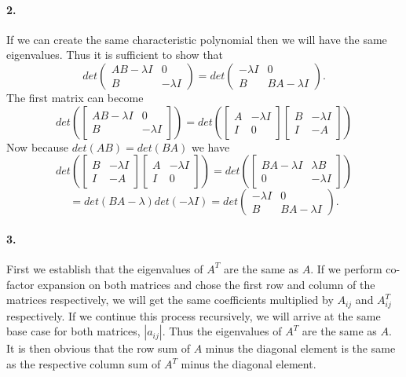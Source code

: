 \documentclass[12pt]{article}
\begin{document}
\paragraph{2.}
	If we can create the same characteristic polynomial then we will have the same eigenvalues. Thus it is sufficient to show that
	\[
	det
	\left(\begin{matrix}
	AB-\lambda I & 0 \\
	B & -\lambda I
	\end{matrix}\right)
	= det
	\left(\begin{matrix}
	-\lambda I & 0 \\
	B & BA-\lambda I
	\end{matrix}\right).
	\]
	The first matrix can become
	\[
	det
	\left(\left[\begin{matrix}
	AB-\lambda I & 0 \\
	B & -\lambda I
	\end{matrix}\right]\right)
	=
	det
	\left(\left[\begin{matrix}
	A & -\lambda I \\
	I & 0
	\end{matrix}\right]
	\left[\begin{matrix}
	B & -\lambda I \\
	I & -A
	\end{matrix}\right]\right)
	\]
	Now because $det(AB) = det(BA)$ we have 
	\[
	det
	\left(\left[\begin{matrix}
	B & -\lambda I \\
	I & -A
	\end{matrix}\right]
	\left[\begin{matrix}
	A & -\lambda I \\
	I & 0
	\end{matrix}\right]\right)
	= det
	\left(\left[\begin{matrix}
	BA-\lambda I & \lambda B \\
	0 & -\lambda I
	\end{matrix}\right]\right)
	\]	
	\[
	= det(BA-\lambda)det(-\lambda I) =
	det
	\left(\begin{matrix}
	-\lambda I & 0 \\
	B & BA-\lambda I
	\end{matrix}\right).
	\]

\paragraph{3.}
	First we establish that the eigenvalues of $A^T$ are the same as $A$. If we perform co-factor expansion on both matrices and chose the first row and column of the matrices respectively, we will get the same coefficients multiplied by $A_{ij}$ and $A_{ij}^T$ respectively. If we continue this process recursively, we will arrive at the same base case for both matrices, $|a_{ij}|$. Thus the eigenvalues of $A^T$ are the same as $A$. It is then obvious that the row sum of $A$ minus the diagonal element is the same as the respective column sum of $A^T$ minus the diagonal element.  
	
\end{document}

